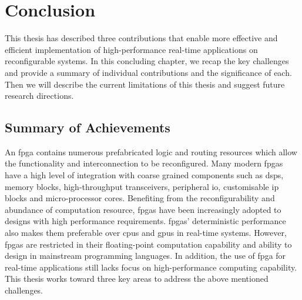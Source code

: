 
\chapter{Conclusion}

\label{ch:conclusion}

This thesis has described three contributions that enable more effective and efficient implementation of high-performance real-time applications on reconfigurable systems.
In this concluding chapter, we recap the key challenges and provide a summary of individual contributions and the significance of each.
Then we will describe the current limitations of this thesis and suggest future research directions.

\section{Summary of Achievements}

An \gls{fpga} contains numerous prefabricated logic and routing resources which allow the functionality and interconnection to be reconfigured.
Many modern \glspl{fpga} have a high level of integration with coarse grained components such as \glspl{dsp}, memory blocks, high-throughput transceivers, peripheral \gls{io}, customisable \gls{ip} blocks and micro-processor cores.
Benefiting from the reconfigurability and abundance of computation resource, \glspl{fpga} have been increasingly adopted to designs with high performance requirements.
\glspl{fpga}' deterministic performance also makes them preferable over \glspl{cpu} and \glspl{gpu} in real-time systems.
However, \glspl{fpga} are restricted in their floating-point computation capability and ability to design in mainstream programming languages.
In addition, the use of \gls{fpga} for real-time applications still lacks focus on high-performance computing capability.
This thesis works toward three key areas to address the above mentioned challenges.

